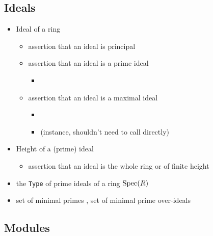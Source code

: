 \subsection{Ideals}

\begin{itemize}
\item
Ideal of a ring 
\begin{itemize}
\item
assertion that an ideal is principal 
\item
assertion that an ideal is a prime ideal 
\begin{itemize}
\item
{}
\end{itemize}
\item
assertion that an ideal is a maximal ideal 
\begin{itemize}
\item
{}
\item
{} (instance, shouldn't need to call directly)
\end{itemize}
\end{itemize}
\item
Height of a (prime) ideal 
\begin{itemize}
\item
assertion that an ideal is the whole ring or of finite height 
\end{itemize}
\item
the \verb|Type| of prime ideals of a ring ${\mathrm{Spec}}(R)$ 
\item
set of minimal primes ,
set of minimal prime over-ideals 
\end{itemize}

\subsection{Modules}

